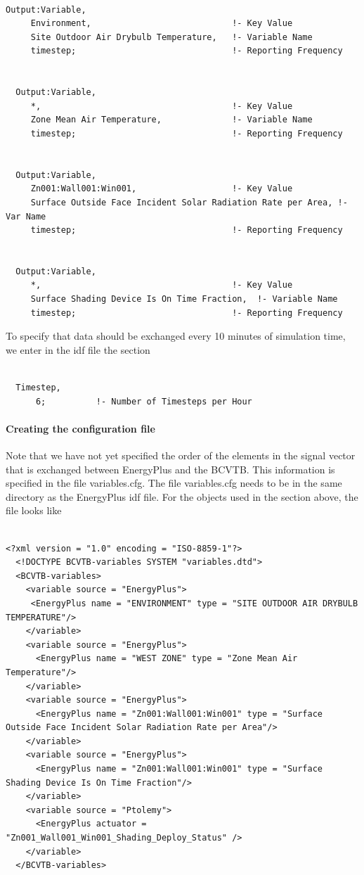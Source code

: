 \begin{lstlisting}

Output:Variable,
     Environment,                            !- Key Value
     Site Outdoor Air Drybulb Temperature,   !- Variable Name
     timestep;                               !- Reporting Frequency


  Output:Variable,
     *,                                      !- Key Value
     Zone Mean Air Temperature,              !- Variable Name
     timestep;                               !- Reporting Frequency


  Output:Variable,
     Zn001:Wall001:Win001,                   !- Key Value
     Surface Outside Face Incident Solar Radiation Rate per Area, !- Var Name
     timestep;                               !- Reporting Frequency


  Output:Variable,
     *,                                      !- Key Value
     Surface Shading Device Is On Time Fraction,  !- Variable Name
     timestep;                               !- Reporting Frequency
\end{lstlisting}

To specify that data should be exchanged every 10 minutes of simulation time, we enter in the idf file the section

\begin{lstlisting}

  Timestep,
      6;          !- Number of Timesteps per Hour
\end{lstlisting}

\paragraph{\textbf{Creating the configuration file}}\label{creating-the-configuration-file-1}

Note that we have not yet specified the order of the elements in the signal vector that is exchanged between EnergyPlus and the BCVTB. This information is specified in the file variables.cfg. The file variables.cfg needs to be in the same directory as the EnergyPlus idf file. For the objects used in the section above, the file looks like

\begin{lstlisting}

<?xml version = "1.0" encoding = "ISO-8859-1"?>
  <!DOCTYPE BCVTB-variables SYSTEM "variables.dtd">
  <BCVTB-variables>
    <variable source = "EnergyPlus">
     <EnergyPlus name = "ENVIRONMENT" type = "SITE OUTDOOR AIR DRYBULB TEMPERATURE"/>
    </variable>
    <variable source = "EnergyPlus">
      <EnergyPlus name = "WEST ZONE" type = "Zone Mean Air Temperature"/>
    </variable>
    <variable source = "EnergyPlus">
      <EnergyPlus name = "Zn001:Wall001:Win001" type = "Surface Outside Face Incident Solar Radiation Rate per Area"/>
    </variable>
    <variable source = "EnergyPlus">
      <EnergyPlus name = "Zn001:Wall001:Win001" type = "Surface Shading Device Is On Time Fraction"/>
    </variable>
    <variable source = "Ptolemy">
      <EnergyPlus actuator = "Zn001_Wall001_Win001_Shading_Deploy_Status" />
    </variable>
  </BCVTB-variables>
\end{lstlisting}

